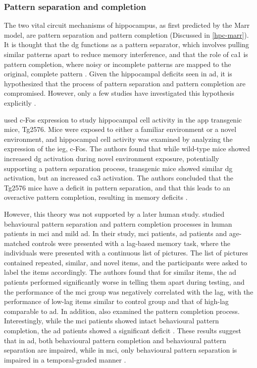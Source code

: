 \subsubsection{Pattern separation and completion}
The two vital circuit mechanisms of hippocampus, as first predicted by the Marr model, are pattern separation and pattern completion (Discussed in \ref{hpc-marr}). It is thought that the \gls{dg} functions as a pattern separator, which involves pulling similar patterns apart to reduce memory interference, and that the role of \gls{ca1} is pattern completion, where noisy or incomplete patterns are mapped to the original, complete pattern \citep{rolls13}. Given the hippocampal deficits seen in \gls{ad}, it is hypothesized that the process of pattern separation and pattern completion are compromised. However, only a few studies have investigated this hypothesis explicitly \citep{maruszak14}. 

\citet{palmer11} used c-Fos expression to study hippocampal cell activity in the \gls{app} transgenic mice, Tg2576. Mice were exposed to either a familiar environment or a novel environment, and hippocampal cell activity was examined by analyzing the expression of the \gls{ieg}, c-Fos. The authors found that while wild-type mice showed increased \gls{dg} activation during novel environment exposure, potentially supporting a pattern separation process, transgenic mice showed similar \gls{dg} activation, but an increased \gls{ca3} activation. The authors concluded that the Tg2576 mice have a deficit in pattern separation, and that this leads to an overactive pattern completion, resulting in memory deficits \citep{palmer11}.

However, this theory was not supported by a later human study. \citet{ally13} studied behavioural pattern separation and pattern completion processes in human patients in \gls{mci} and mild \gls{ad}. In their study, \gls{mci} patients, \gls{ad} patients and age-matched controls were presented with a lag-based memory task, where the individuals were presented with a continuous list of pictures. The list of pictures contained repeated, similar, and novel items, and the participants were asked to label the items accordingly. The authors found that for similar items, the \gls{ad} patients performed significantly worse in telling them apart during testing, and the performance of the \gls{mci} group was negatively correlated with the lag, with the performance of low-lag items similar to control group and that of high-lag comparable to \gls{ad}.  In addition, \citet{ally13} also examined the pattern completion process. Interestingly, while the \gls{mci} patients showed intact behavioural pattern completion, the \gls{ad} patients showed a significant deficit \citep{ally13}. These results suggest that in \gls{ad}, both behavioural pattern completion and behavioural pattern separation are impaired, while in \gls{mci}, only behavioural pattern separation is impaired in a temporal-graded manner \citep{ally13}.

